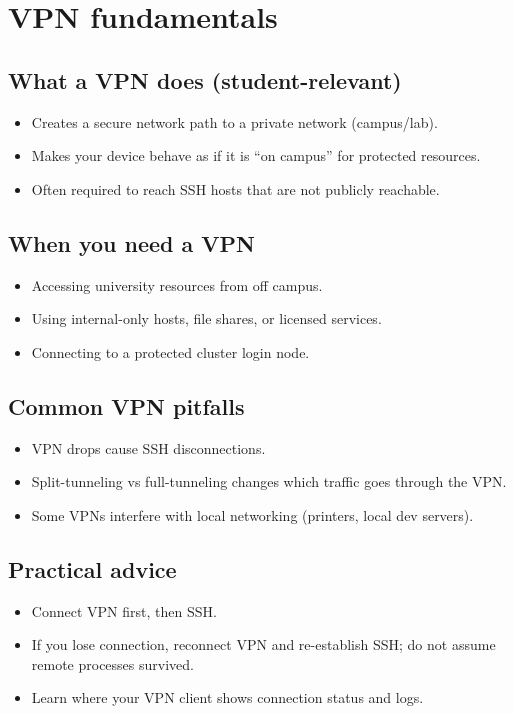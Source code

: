 \section{VPN fundamentals}
\subsection{What a VPN does (student-relevant)}
\begin{itemize}
\item Creates a secure network path to a private network (campus/lab).
\item Makes your device behave as if it is ``on campus'' for protected resources.
\item Often required to reach SSH hosts that are not publicly reachable.
\end{itemize}

\subsection{When you need a VPN}
\begin{itemize}
\item Accessing university resources from off campus.
\item Using internal-only hosts, file shares, or licensed services.
\item Connecting to a protected cluster login node.
\end{itemize}

\subsection{Common VPN pitfalls}
\begin{itemize}
\item VPN drops cause SSH disconnections.
\item Split-tunneling vs full-tunneling changes which traffic goes through the VPN.
\item Some VPNs interfere with local networking (printers, local dev servers).
\end{itemize}

\subsection{Practical advice}
\begin{itemize}
\item Connect VPN first, then SSH.
\item If you lose connection, reconnect VPN and re-establish SSH; do not assume remote processes survived.
\item Learn where your VPN client shows connection status and logs.
\end{itemize}

